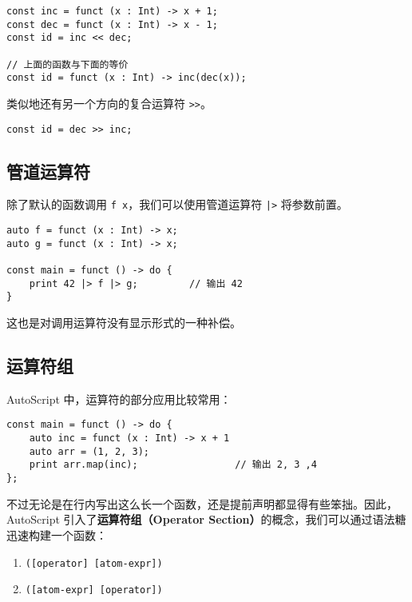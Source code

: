 \begin{lstlisting}
const inc = funct (x : Int) -> x + 1;
const dec = funct (x : Int) -> x - 1;
const id = inc << dec;

// 上面的函数与下面的等价
const id = funct (x : Int) -> inc(dec(x));
\end{lstlisting}

类似地还有另一个方向的复合运算符 \lstinline!>>!。

\begin{lstlisting}
const id = dec >> inc;
\end{lstlisting}

\subsection{管道运算符}

除了默认的函数调用 \lstinline!f x!，我们可以使用管道运算符 \lstinline!|>! 将参数前置。

\begin{lstlisting}
auto f = funct (x : Int) -> x;
auto g = funct (x : Int) -> x;

const main = funct () -> do {
    print 42 |> f |> g;			// 输出 42
}
\end{lstlisting}

这也是对调用运算符没有显示形式的一种补偿。

\subsection{运算符组}

AutoScript 中，运算符的部分应用比较常用：

\begin{minipage}[c]{0.95\textwidth}
\vspace{1.0em}
\begin{lstlisting}
const main = funct () -> do {
    auto inc = funct (x : Int) -> x + 1
	auto arr = (1, 2, 3);
	print arr.map(inc);					// 输出 2, 3 ,4
};
\end{lstlisting}
\end{minipage}

不过无论是在行内写出这么长一个函数，还是提前声明都显得有些笨拙。因此，AutoScript 引入了\textbf{运算符组（Operator Section）}的概念，我们可以通过语法糖迅速构建一个函数：

\begin{grammar}[运算符组] \label{grm:operator-section}
\begin{enumerate}
	\item \texttt{([operator] [atom-expr])}
	\item \texttt{([atom-expr] [operator])}
\end{enumerate}
\end{grammar}

